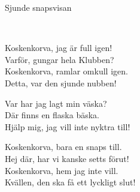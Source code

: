 \begin{song}{Sjunde snapsvisan}
	
	
	\\
	
	Koskenkorva, jag är full igen!\\
	Varför, gungar hela Klubben?\\	
	Koskenkorva, ramlar omkull igen.\\
	Detta, var den sjunde nubben!
	
	Var har jag lagt min väska?\\
	Där finns en flaska bäska.\\
	Hjälp mig, jag vill inte nyktra till!
	
	Koskenkorva, bara en snaps till.\\
	Hej där, har vi kanske setts förut!\\
	Koskenkorva, hem jag inte vill.\\
	Kvällen, den ska få ett lyckligt slut!
	
\end{song}
